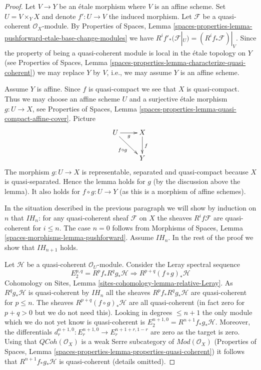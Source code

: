 \documentclass[10pt,a4paper]{amsart}
\theoremstyle{plain}
\theoremstyle{definition}
\theoremstyle{remark}
\numberwithin{equation}{subsection}
\def\QCoh{\mathit{QCoh}}
\begin{document}
\begin{proof}
Let $V \to Y$ be an \'etale morphism where $V$ is an affine scheme. Set
$U = V \times_Y X$ and denote $f' : U \to V$ the induced morphism.
Let $\mathcal{F}$ be a quasi-coherent $\mathcal{O}_X$-module. By
Properties of Spaces, Lemma
\ref{spaces-properties-lemma-pushforward-etale-base-change-modules}
we have
$R^if'_*(\mathcal{F}|_U) = (R^if_*\mathcal{F})|_V$.
Since the property of being a quasi-coherent module is local in the
\'etale topology on $Y$ (see
Properties of Spaces, Lemma
\ref{spaces-properties-lemma-characterize-quasi-coherent})
we may replace $Y$ by $V$, i.e., we may assume $Y$ is an affine scheme.

\medskip\noindent
Assume $Y$ is affine. Since $f$ is quasi-compact we see that $X$
is quasi-compact. Thus we may choose an affine scheme $U$ and a surjective
\'etale morphism $g : U \to X$, see
Properties of Spaces,
Lemma \ref{spaces-properties-lemma-quasi-compact-affine-cover}.
Picture
$$
\xymatrix{
U \ar[r]_g \ar[rd]_{f \circ g} & X \ar[d]^f \\
& Y
}
$$
The morphism $g : U \to X$ is representable, separated
and quasi-compact because $X$ is quasi-separated. Hence the lemma
holds for $g$ (by the discussion above the lemma).
It also holds for $f \circ g : U \to Y$ (as this is a morphism
of affine schemes).

\medskip\noindent
In the situation described in the previous paragraph we will show by
induction on $n$ that $IH_n$: for any quasi-coherent sheaf $\mathcal{F}$
on $X$ the sheaves $R^if\mathcal{F}$
are quasi-coherent for $i \leq n$.
The case $n = 0$ follows from
Morphisms of Spaces, Lemma \ref{spaces-morphisms-lemma-pushforward}.
Assume $IH_n$. In the rest of the proof we show that $IH_{n + 1}$ holds.

\medskip\noindent
Let $\mathcal{H}$ be a quasi-coherent $\mathcal{O}_U$-module.
Consider the Leray spectral sequence
$$
E_2^{p, q} = R^pf_* R^qg_* \mathcal{H}
\Rightarrow
R^{p + q}(f \circ g)_*\mathcal{H}
$$
Cohomology on Sites, Lemma \ref{sites-cohomology-lemma-relative-Leray}.
As $R^qg_*\mathcal{H}$ is quasi-coherent by $IH_n$ all the sheaves
$R^pf_*R^qg_*\mathcal{H}$ are quasi-coherent for $p \leq n$.
The sheaves $R^{p + q}(f \circ g)_*\mathcal{H}$ are all
quasi-coherent (in fact zero for $p + q > 0$ but we do not need this).
Looking in degrees $\leq n + 1$ the only module which we do not
yet know is quasi-coherent is $E_2^{n + 1, 0} = R^{n + 1}f_*g_*\mathcal{H}$.
Moreover, the differentials
$d_r^{n + 1, 0} : E_r^{n + 1, 0} \to E_r^{n + 1 + r, 1 - r}$
are zero as the target is zero. Using that $\QCoh(\mathcal{O}_X)$
is a weak Serre subcategory of $\textit{Mod}(\mathcal{O}_X)$
(Properties of Spaces, Lemma
\ref{spaces-properties-lemma-properties-quasi-coherent}) it
follows that $R^{n + 1}f_*g_*\mathcal{H}$
is quasi-coherent (details omitted).


\end{proof}
\end{document}
